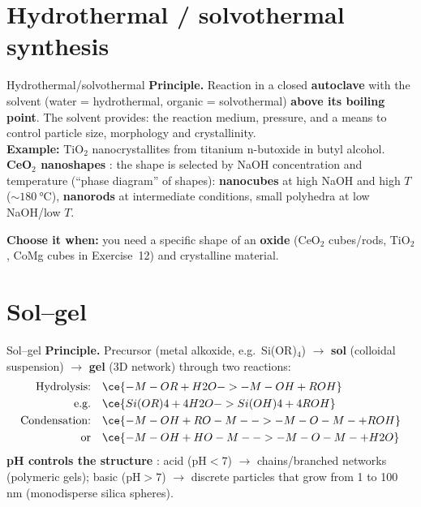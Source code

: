 \section{Hydrothermal / solvothermal synthesis}
\begin{cardbox}{Hydrothermal/solvothermal }
\textbf{Principle.} Reaction in a closed \textbf{autoclave} with the solvent (water = hydrothermal, organic = solvothermal)
\textbf{above its boiling point}. The solvent provides: the reaction medium, pressure, and a means to control particle
size, morphology and crystallinity.\\
\textbf{Example:} TiO$_2$ nanocrystallites from titanium n-butoxide in butyl alcohol.\\
\textbf{CeO$_2$ nanoshapes} : the shape is selected by NaOH concentration and temperature
(``phase diagram'' of shapes): \textbf{nanocubes} at high NaOH and high $T$ ($\sim\SI{180}{\celsius}$),
\textbf{nanorods} at intermediate conditions, small polyhedra at low NaOH/low $T$.
\end{cardbox}
\textbf{Choose it when:} you need a specific shape of an \textbf{oxide} (CeO$_2$ cubes/rods, TiO$_2$, CoMg cubes in
Exercise~12) and crystalline material.

\section{Sol--gel}
\begin{cardbox}{Sol--gel }
\textbf{Principle.} Precursor (metal alkoxide, e.g.\ Si(OR)$_4$) $\to$ \textbf{sol} (colloidal suspension) $\to$
\textbf{gel} (3D network) through two reactions:
\begin{align*}
\text{Hydrolysis:}\quad & \ce{-M-OR + H2O -> -M-OH + ROH}\\
\text{e.g.}\quad & \ce{Si(OR)4 + 4H2O -> Si(OH)4 + 4ROH}\\
\text{Condensation:}\quad & \ce{-M-OH + RO-M- -> -M-O-M- + ROH}\\
\text{or}\quad & \ce{-M-OH + HO-M- -> -M-O-M- + H2O}
\end{align*}
\textbf{pH controls the structure} : acid ($\mathrm{pH}<7$) $\to$ chains/branched networks (polymeric gels);
basic ($\mathrm{pH}>7$) $\to$ discrete particles that grow from 1 to 100 nm (monodisperse silica spheres).
\end{cardbox}

